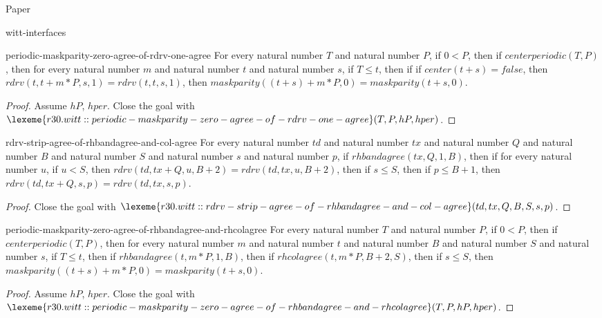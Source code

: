 \begin{lexlean}{Paper}
\begin{section}{witt-interfaces}
  \begin{theorem}{periodic-maskparity-zero-agree-of-rdrv-one-agree}
  For every natural number \(T\) and natural number \(P\), if \(0 < P\), then if \(centerperiodic(T, P)\), then for every natural number \(m\) and natural number \(t\) and natural number \(s\), if \(T ≤ t\), then if if \(center(t + s) = false\), then \(rdrv(t, t + m * P, s, 1) = rdrv(t, t, s, 1)\), then \(maskparity((t + s) + m * P, 0) = maskparity(t + s, 0)\).
  \begin{proof}
  Assume \(hP\), \(hper\).
  Close the goal with \(\lexeme{r30.witt::periodic-maskparity-zero-agree-of-rdrv-one-agree}(T, P, hP, hper)\).
  \end{proof}
  \end{theorem}

  \begin{theorem}{rdrv-strip-agree-of-rhbandagree-and-col-agree}
  For every natural number \(td\) and natural number \(tx\) and natural number \(Q\) and natural number \(B\) and natural number \(S\) and natural number \(s\) and natural number \(p\), if \(rhbandagree(tx, Q, 1, B)\), then if for every natural number \(u\), if \(u < S\), then \(rdrv(td, tx + Q, u, B + 2) = rdrv(td, tx, u, B + 2)\), then if \(s ≤ S\), then if \(p ≤ B + 1\), then \(rdrv(td, tx + Q, s, p) = rdrv(td, tx, s, p)\).
  \begin{proof}
  Close the goal with \(\lexeme{r30.witt::rdrv-strip-agree-of-rhbandagree-and-col-agree}(td, tx, Q, B, S, s, p)\).
  \end{proof}
  \end{theorem}

  \begin{theorem}{periodic-maskparity-zero-agree-of-rhbandagree-and-rhcolagree}
  For every natural number \(T\) and natural number \(P\), if \(0 < P\), then if \(centerperiodic(T, P)\), then for every natural number \(m\) and natural number \(t\) and natural number \(B\) and natural number \(S\) and natural number \(s\), if \(T ≤ t\), then if \(rhbandagree(t, m * P, 1, B)\), then if \(rhcolagree(t, m * P, B + 2, S)\), then if \(s ≤ S\), then \(maskparity((t + s) + m * P, 0) = maskparity(t + s, 0)\).
  \begin{proof}
  Assume \(hP\), \(hper\).
  Close the goal with \(\lexeme{r30.witt::periodic-maskparity-zero-agree-of-rhbandagree-and-rhcolagree}(T, P, hP, hper)\).
  \end{proof}
  \end{theorem}


\end{section}
\end{lexlean}
